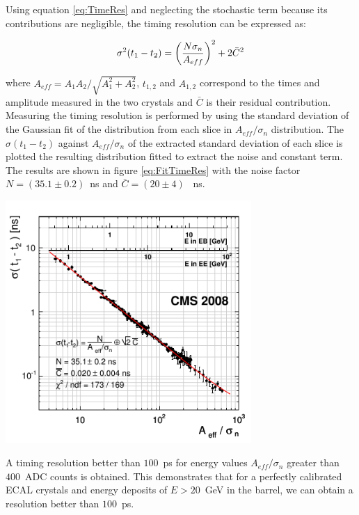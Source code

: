 Using equation \ref{eq:TimeRes} and neglecting the stochastic term because its contributions are negligible, the timing resolution can be expressed as:
 
 \begin{equation}{\label{eq:ResTime}}
 \sigma^{2}(t_{1} - t_{2}) = \left(\frac{N\sigma_{n}}{A_{eff}}\right)^{2} + 2\bar{C}^{2}
 \end{equation}
 
 where $A_{eff} = A_{1}A_{2}/\sqrt{A^{2}_{1} + A^{2}_{2}}$, $t_{1,2}$ and $A_{1,2}$ correspond to the times and amplitude measured in the two crystals and $\bar{C}$ is their residual contribution.
Measuring the timing resolution is performed by using the standard deviation of the Gaussian fit of the distribution from each slice in $A_{eff}/\sigma_{n}$ distribution. The $\sigma(t_{1} - t_{2})$ against $A_{eff}/\sigma_{n}$ of the extracted standard deviation of each slice is plotted the resulting distribution fitted to extract the noise and constant term. The results are shown in figure \ref{eq:FitTimeRes} with the noise factor $N = (35.1 \pm 0.2)$~ns and $\bar{C} = (20 \pm 4)$ ~ns. 

\begin{center}{\label{eq:FitTimeRes}}
\centering
\mbox{\includegraphics[height=0.7\textwidth, width=0.7\textwidth]{THESISPLOTS/ECAL_Timing_Resolution.png}}
\label{fig:FitTimeRes}
\end{center}
A timing resolution better than $100$~ps for energy values $A_{eff}/\sigma_{n}$ greater than $400$~ADC counts is obtained. This demonstrates that for a perfectly calibrated ECAL crystals and energy deposits of $E > 20$~GeV in the barrel, we can obtain a resolution better than $100$~ps. 

